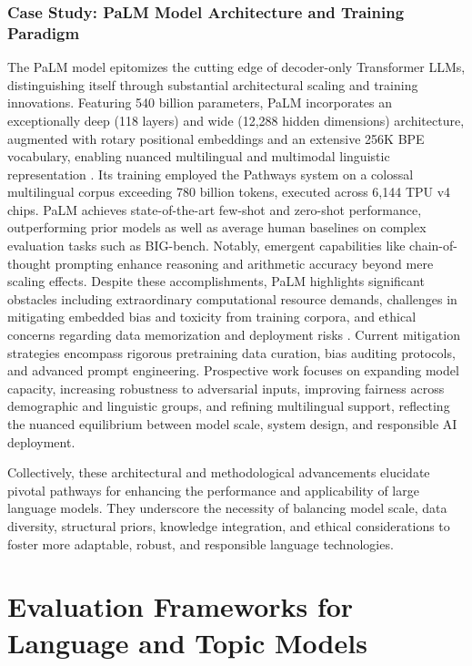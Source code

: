 \documentclass[sigconf]{acmart}
\begin{document}
\subsubsection{Case Study: PaLM Model Architecture and Training Paradigm}

The PaLM model epitomizes the cutting edge of decoder-only Transformer LLMs, distinguishing itself through substantial architectural scaling and training innovations. Featuring 540 billion parameters, PaLM incorporates an exceptionally deep (118 layers) and wide (12,288 hidden dimensions) architecture, augmented with rotary positional embeddings and an extensive 256K BPE vocabulary, enabling nuanced multilingual and multimodal linguistic representation \cite{ref7}. Its training employed the Pathways system on a colossal multilingual corpus exceeding 780 billion tokens, executed across 6,144 TPU v4 chips. PaLM achieves state-of-the-art few-shot and zero-shot performance, outperforming prior models as well as average human baselines on complex evaluation tasks such as BIG-bench. Notably, emergent capabilities like chain-of-thought prompting enhance reasoning and arithmetic accuracy beyond mere scaling effects. Despite these accomplishments, PaLM highlights significant obstacles including extraordinary computational resource demands, challenges in mitigating embedded bias and toxicity from training corpora, and ethical concerns regarding data memorization and deployment risks \cite{ref7}. Current mitigation strategies encompass rigorous pretraining data curation, bias auditing protocols, and advanced prompt engineering. Prospective work focuses on expanding model capacity, increasing robustness to adversarial inputs, improving fairness across demographic and linguistic groups, and refining multilingual support, reflecting the nuanced equilibrium between model scale, system design, and responsible AI deployment.

Collectively, these architectural and methodological advancements elucidate pivotal pathways for enhancing the performance and applicability of large language models. They underscore the necessity of balancing model scale, data diversity, structural priors, knowledge integration, and ethical considerations to foster more adaptable, robust, and responsible language technologies.

\section{Evaluation Frameworks for Language and Topic Models}
\end{document}
